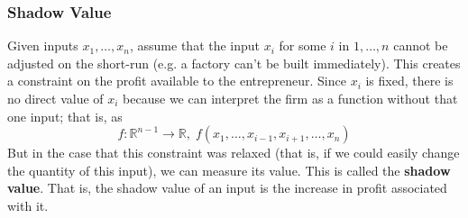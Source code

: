 \documentclass{article}
\begin{document}
    \subsubsection{Shadow Value}

      \begin{definition}
        Given inputs $x_1, \ldots, x_n$, assume that the input $x_i$ for some $i$ in $1, \ldots, n$ cannot be adjusted on the short-run (e.g. a factory can't be built immediately). This creates a constraint on the profit available to the entrepreneur. Since $x_i$ is fixed, there is no direct value of $x_i$ because we can interpret the firm as a function without that one input; that is, as 
        \[f: \mathbb{R}^{n-1} \longrightarrow \mathbb{R}, \; f(x_1, \ldots, x_{i-1}, x_{i+1}, \ldots, x_n)\]
        But in the case that this constraint was relaxed (that is, if we could easily change the quantity of this input), we can measure its value. This is called the \textbf{shadow value}. That is, the shadow value of an input is the increase in profit associated with it. 
      \end{definition}
\end{document}
